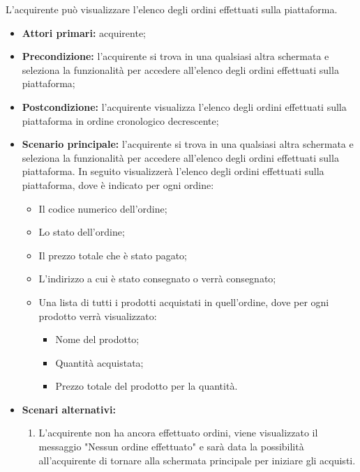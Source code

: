 
L'acquirente può visualizzare l'elenco degli ordini effettuati sulla piattaforma.
\begin{itemize}
    \item \textbf{Attori primari:} acquirente;
    \item \textbf{Precondizione:} l'acquirente si trova in una qualsiasi altra schermata e seleziona la funzionalità per accedere all'elenco degli ordini effettuati sulla piattaforma;
    \item \textbf{Postcondizione:} l'acquirente visualizza l'elenco degli ordini effettuati sulla piattaforma in ordine cronologico decrescente;
    \item \textbf{Scenario principale:} l'acquirente si trova in una qualsiasi altra schermata e seleziona la funzionalità per accedere all'elenco degli ordini effettuati sulla piattaforma. In seguito visualizzerà l'elenco degli ordini effettuati sulla piattaforma, dove è indicato per ogni ordine:
    \begin{itemize}
        \item Il codice numerico dell'ordine;
        \item Lo stato dell'ordine;
        \item Il prezzo totale che è stato pagato;
        \item L'indirizzo a cui è stato consegnato o verrà consegnato;
        \item Una lista di tutti i prodotti acquistati in quell'ordine, dove per ogni prodotto verrà visualizzato:
        \begin{itemize}
            \item Nome del prodotto;
            \item Quantità acquistata;
            \item Prezzo totale del prodotto per la quantità.
        \end{itemize}
    \end{itemize}
    \item \textbf{Scenari alternativi:} 
    \begin{enumerate}[label=\lett]
        \item L'acquirente non ha ancora effettuato ordini, viene visualizzato il messaggio "Nessun ordine effettuato" e sarà data la possibilità all'acquirente di tornare alla schermata principale per iniziare gli acquisti.
    \end{enumerate}
\end{itemize}

